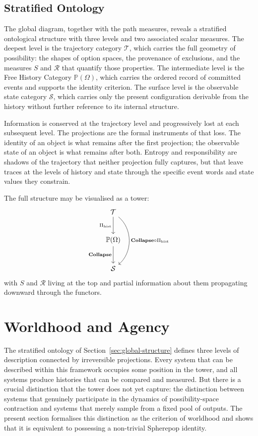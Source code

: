 \documentclass[12pt]{article}
\theoremstyle{plain}
\theoremstyle{definition}
\theoremstyle{remark}
\newcommand{\Collapse}{\mathbf{Collapse}}
\newcommand{\PathCat}{\mathbb{P}(\Omega)}
\begin{document}
\subsection{Stratified Ontology}

The global diagram, together with the path measures, reveals a stratified
ontological structure with three levels and two associated scalar measures.  The
deepest level is the trajectory category $\mathcal{T}$, which carries the full
geometry of possibility: the shapes of option spaces, the provenance of
exclusions, and the measures $S$ and $\mathcal{R}$ that quantify those
properties.  The intermediate level is the Free History Category $\PathCat$,
which carries the ordered record of committed events and supports the identity
criterion.  The surface level is the observable state category $\mathcal{S}$,
which carries only the present configuration derivable from the history without
further reference to its internal structure.

Information is conserved at the trajectory level and progressively lost at each
subsequent level.  The projections are the formal instruments of that loss.
The identity of an object is what remains after the first projection; the
observable state of an object is what remains after both.  Entropy and
responsibility are shadows of the trajectory that neither projection fully
captures, but that leave traces at the levels of history and state through the
specific event words and state values they constrain.

The full structure may be visualised as a tower:
\[
\begin{tikzcd}[row sep=2.5em]
  \mathcal{T} \arrow[d, "\Pi_{\mathrm{hist}}"']
    \arrow[bend left=50]{dd}{\Collapse \circ \Pi_{\mathrm{hist}}} \\
  \PathCat \arrow[d, "\Collapse"'] \\
  \mathcal{S}
\end{tikzcd}
\]
with $S$ and $\mathcal{R}$ living at the top and partial information about them
propagating downward through the functors.
\section{Worldhood and Agency}
\label{sec:worldhood}

The stratified ontology of Section~\ref{sec:global-structure} defines three
levels of description connected by irreversible projections.  Every system that
can be described within this framework occupies some position in the tower, and
all systems produce histories that can be compared and measured.  But there is
a crucial distinction that the tower does not yet capture: the distinction
between systems that genuinely participate in the dynamics of possibility-space
contraction and systems that merely sample from a fixed pool of outputs.  The
present section formalises this distinction as the criterion of worldhood and
shows that it is equivalent to possessing a non-trivial Spherepop identity.
\end{document}
